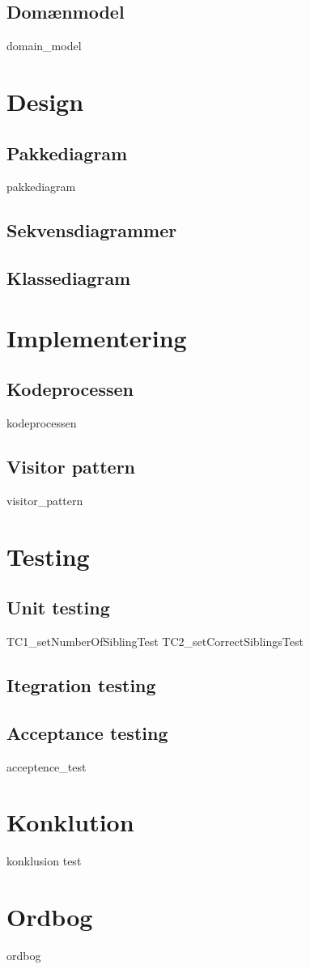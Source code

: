\documentclass{article}
\begin{document}
{\subsection{Domænmodel}
{domain_model}
\newpage

\section{Design}

\subsection{Pakkediagram}
{pakkediagram}
\newpage
\subsection{Sekvensdiagrammer}
\subsection{Klassediagram}

\section{Implementering}
\subsection{Kodeprocessen}
{kodeprocessen}
\subsection{Visitor pattern}
{visitor_pattern}
\newpage
\section{Testing}
\subsection{Unit testing}
{TC1_setNumberOfSiblingTest}
{TC2_setCorrectSiblingsTest}
\subsection{Itegration testing}

\subsection{Acceptance testing}
{acceptence_test}

\section{Konklution}
{konklusion}
test

\newpage
\section*{Ordbog}

{ordbog}




\newpage
\cleardoublepage
\printbibliography[heading=bibintoc]
}
\end{document}
